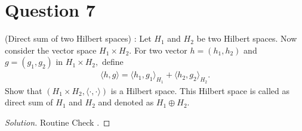 \section{Question 7}

\horz

(Direct sum of two Hilbert spaces) : Let $H_1$ and $H_2$ be two Hilbert spaces. Now consider the vector space $H_1\times H_2.$ For two vector $h=(h_1,h_2)$ and $g=(g_1,g_2)$ in $H_1\times H_2,$ define
\begin{align*}
\langle h,g\rangle = \langle h_1,g_1\rangle_{H_1} + \langle h_2,g_2\rangle_{H_2}.
\end{align*}
Show that  $(H_1\times H_2, \langle \cdot,\cdot\rangle )$ is a Hilbert space. This Hilbert space is called as direct sum of $H_1$ and $H_2$ and denoted as $H_1\oplus H_2.$ 

\horz

\begin{proof}[Solution]
    Routine Check \checkmark.
\end{proof}
